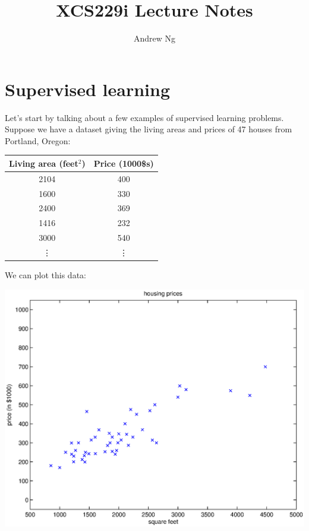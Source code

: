 \documentclass{article}
\begin{document}
\title{XCS229i Lecture Notes}
\author{Andrew Ng}
\date{}
\maketitle


\section*{Supervised learning}


Let's start by talking about a few examples of supervised learning problems.
Suppose we have a dataset giving the living areas and prices of 47 houses from
Portland, Oregon:
%
\begin{center}
\begin{tabular}{c|c}
Living area (feet$^2$) & Price (1000\$s) \\ \hline
2104 & 400  \\
1600 & 330  \\
2400 & 369  \\
1416 & 232  \\
3000 & 540  \\
\vdots & \vdots
\end{tabular}
\end{center}

We can plot this data:
\begin{center}
\includegraphics[scale=0.4]{housingData.eps}
\end{center}
\end{document}
